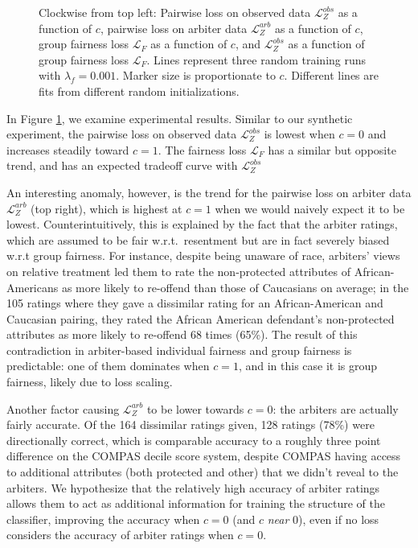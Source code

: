 \begin{figure}
            \caption{Clockwise from top left: Pairwise loss on observed data $\mathcal{L}_Z^{obs}$  as a function of $c$, pairwise loss on arbiter data $\mathcal{L}_Z^{arb}$ as a function of $c$, group fairness loss $\mathcal{L}_F$ as a function of $c$, and $\mathcal{L}_Z^{obs}$ as a function of group fairness loss $\mathcal{L}_F$.  Lines represent three random training runs with $\lambda_f = 0.001$.  Marker size is proportionate to $c$. Different lines are fits from different random initializations.}
            \label{fig:sm_compas_tradeoffs}
        \end{figure}
        
        In Figure \ref{fig:sm_compas_tradeoffs}, we examine experimental results.  Similar to our synthetic experiment, the pairwise loss on observed data $\mathcal{L}_Z^{obs}$ is lowest when $c = 0$ and increases steadily toward $c = 1$.  The fairness loss $\mathcal{L}_F$ has a similar but opposite trend, and has an expected tradeoff curve with $\mathcal{L}_Z^{obs}$
        
        An interesting anomaly, however, is the trend for the pairwise loss on arbiter data $\mathcal{L}_Z^{arb}$ (top right), which is highest at $c = 1$ when we would naively expect it to be lowest.  Counterintuitively, this is explained by the fact that the arbiter ratings, which are assumed to be fair w.r.t.~resentment but are in fact severely biased w.r.t group fairness.  For instance, despite being unaware of race, arbiters' views on relative treatment led them to rate the non-protected attributes of African-Americans as more likely to re-offend than those of Caucasians on average; in the 105 ratings where they gave a dissimilar rating for an African-American and Caucasian pairing, they rated the African American defendant's non-protected attributes as more likely to re-offend 68 times (65\%). The result of this contradiction in arbiter-based individual fairness and group fairness is predictable: one of them dominates when $c=1$, and in this case it is group fairness, likely due to loss scaling.  
        
        Another factor causing $\mathcal{L}_Z^{arb}$ to be lower towards $c=0$: the arbiters are actually fairly accurate.  Of the 164 dissimilar ratings given, 128 ratings (78\%) were directionally correct, which is comparable accuracy to a roughly three point difference on the COMPAS decile score system, despite COMPAS having access to additional attributes (both protected and other) that we didn't reveal to the arbiters. We hypothesize that the relatively high accuracy of arbiter ratings allows them to act as additional information for training the structure of the classifier, improving the accuracy when $c=0$ (and $c$ \emph{near} 0), even if no loss considers the accuracy of arbiter ratings when $c = 0$. 
        
